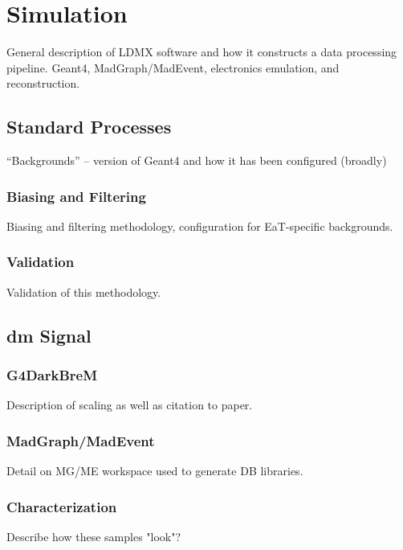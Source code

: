 \chapter{Simulation}
\label{chapter:ldmx:simulation}

General description of LDMX software and how it constructs a data processing
pipeline. Geant4, MadGraph/MadEvent, electronics emulation, and reconstruction.

\section{Standard Processes}
``Backgrounds'' -- version of Geant4 and how it has been configured (broadly)

\subsection{Biasing and Filtering}
Biasing and filtering methodology, configuration for EaT-specific backgrounds.

\subsection{Validation}
Validation of this methodology.

\section{\gls{dm} Signal}

\subsection{G4DarkBreM}
Description of scaling as well as citation to paper.

\subsection{MadGraph/MadEvent}
Detail on MG/ME workspace used to generate DB libraries.

\subsection{Characterization}
Describe how these samples "look"?

